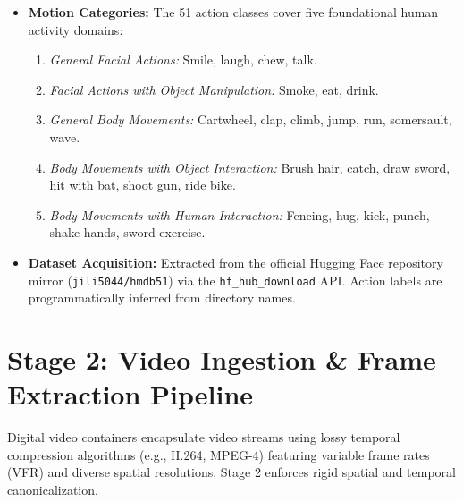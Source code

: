 \documentclass[a4paper, 11pt]{article}
\begin{document}
\begin{itemize}
    \item \textbf{Motion Categories:} The 51 action classes cover five foundational human activity domains:
    \begin{enumerate}
        \item \textit{General Facial Actions:} Smile, laugh, chew, talk.
        \item \textit{Facial Actions with Object Manipulation:} Smoke, eat, drink.
        \item \textit{General Body Movements:} Cartwheel, clap, climb, jump, run, somersault, wave.
        \item \textit{Body Movements with Object Interaction:} Brush hair, catch, draw sword, hit with bat, shoot gun, ride bike.
        \item \textit{Body Movements with Human Interaction:} Fencing, hug, kick, punch, shake hands, sword exercise.
    \end{enumerate}
    \item \textbf{Dataset Acquisition:} Extracted from the official Hugging Face repository mirror (\texttt{jili5044/hmdb51}) via the \texttt{hf\_hub\_download} API. Action labels are programmatically inferred from directory names.
\end{itemize}

\section{Stage 2: Video Ingestion \& Frame Extraction Pipeline}

Digital video containers encapsulate video streams using lossy temporal compression algorithms (e.g., H.264, MPEG-4) featuring variable frame rates (VFR) and diverse spatial resolutions. Stage 2 enforces rigid spatial and temporal canonicalization.
\end{document}
